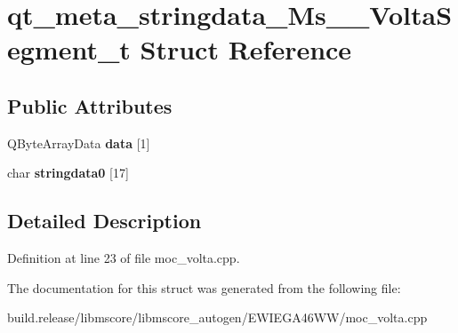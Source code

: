 \hypertarget{structqt__meta__stringdata___ms_____volta_segment__t}{}\section{qt\+\_\+meta\+\_\+stringdata\+\_\+\+Ms\+\_\+\+\_\+\+Volta\+Segment\+\_\+t Struct Reference}
\label{structqt__meta__stringdata___ms_____volta_segment__t}
\subsection*{Public Attributes}
\begin{DoxyCompactItemize}
\item 
\mbox{\label{structqt__meta__stringdata___ms_____volta_segment__t_a857783b30ca801f98e69d28fceb00842}} 
Q\+Byte\+Array\+Data {\bfseries data} \mbox{[}1\mbox{]}
\item 
\mbox{\label{structqt__meta__stringdata___ms_____volta_segment__t_ab2470340d2f0f6a3a323c5ffa2770842}} 
char {\bfseries stringdata0} \mbox{[}17\mbox{]}
\end{DoxyCompactItemize}


\subsection{Detailed Description}


Definition at line 23 of file moc\+\_\+volta.\+cpp.



The documentation for this struct was generated from the following file\+:\begin{DoxyCompactItemize}
\item 
build.\+release/libmscore/libmscore\+\_\+autogen/\+E\+W\+I\+E\+G\+A46\+W\+W/moc\+\_\+volta.\+cpp\end{DoxyCompactItemize}
